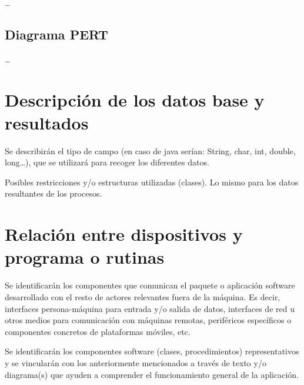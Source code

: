 \documentclass[12pt,a4paper,titlepage]{article}
\begin{document}
    \dots

    \subsection{Diagrama PERT}

    \dots

    \section{Descripción de los datos base y resultados}

    Se describirán el tipo de campo (en caso de java serían: String, char, int, double, long\dots), que se utilizará para recoger los diferentes datos.

    Posibles restricciones y/o estructuras utilizadas (clases). Lo mismo para los datos resultantes de los procesos.

    \section{Relación entre dispositivos y programa o rutinas}

    Se identificarán los componentes que comunican el paquete o aplicación software desarrollado con el resto de actores relevantes fuera de la máquina. Es decir, interfaces persona-máquina para entrada y/o salida de datos, interfaces de red u otros medios para comunicación con máquinas remotas, periféricos específicos o componentes concretos de plataformas móviles, etc.

    Se identificarán los componentes software (clases, procedimientos) representativos y se vincularán con los anteriormente mencionados a través de texto y/o diagrama(s) que ayuden a comprender el funcionamiento general de la aplicación.

    \newpage

    
\end{document}
